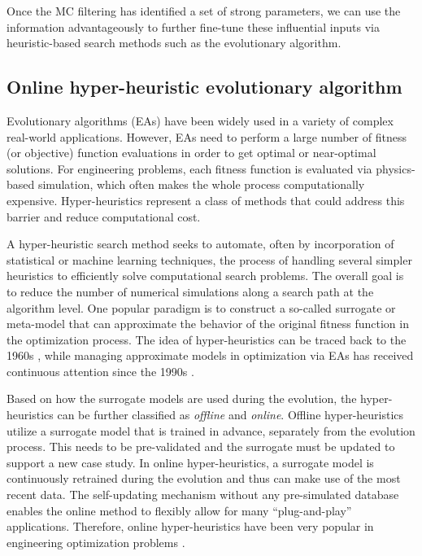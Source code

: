 Once the MC filtering has identified a set of strong parameters, we can use the information advantageously to further fine-tune these influential inputs via heuristic-based search methods such as the evolutionary algorithm.

\subsection{Online hyper-heuristic evolutionary algorithm}

Evolutionary algorithms (EAs) have been widely used in a variety of complex real-world applications. However, EAs need to perform a large number of fitness (or objective) function evaluations in order to get optimal or near-optimal solutions. For engineering problems, each fitness function is evaluated via physics-based simulation, which often makes the whole process computationally expensive. Hyper-heuristics represent a class of methods that could address this barrier and reduce computational cost.

A hyper-heuristic search method seeks to automate, often by incorporation of statistical or machine learning techniques, the process of handling several simpler heuristics to efficiently solve computational search problems. The overall goal is to reduce the number of numerical simulations along a search path at the algorithm level. One popular paradigm is to construct a so-called surrogate or meta-model that can approximate the behavior of the original fitness function in the optimization process. The idea of hyper-heuristics can be traced back to the 1960s \cite{dunham1963design}, while managing approximate models in optimization via EAs has received continuous attention since the 1990s \cite{jin2005comprehensive}.

Based on how the surrogate models are used during the evolution, the hyper-heuristics can be further classified as \textit{offline} and \textit{online}. Offline hyper-heuristics utilize a surrogate model that is trained in advance, separately from the evolution process. This needs to be pre-validated and the surrogate must be updated to support a new case study. In online hyper-heuristics, a surrogate model is continuously retrained during the evolution and thus can make use of the most recent data. The self-updating mechanism without any pre-simulated database enables the online method to flexibly allow for many ``plug-and-play'' applications. Therefore, online hyper-heuristics have been very popular in engineering optimization problems \cite{tenne2010computational}.

